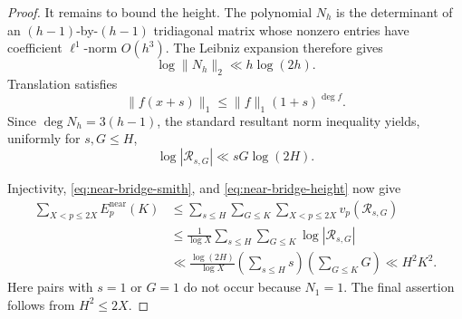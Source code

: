 \begin{proof}
It remains to bound the height.  The polynomial \(N_h\) is the determinant
of an \((h-1)\)-by-\((h-1)\) tridiagonal matrix whose nonzero entries have
coefficient \(\ell^1\)-norm \(O(h^3)\).  The Leibniz expansion therefore
gives
\[
 \log\lVert N_h\rVert_2\ll h\log(2h).
\]
Translation satisfies
\[
 \lVert f(x+s)\rVert_1
 \le \lVert f\rVert_1(1+s)^{\deg f}.
\]
Since \(\deg N_h=3(h-1)\), the standard resultant norm inequality yields,
uniformly for \(s,G\le H\),
\begin{equation}
 \log|\mathcal R_{s,G}|
 \ll sG\log(2H).
 \label{eq:near-bridge-height}
\end{equation}

Injectivity, \eqref{eq:near-bridge-smith}, and
\eqref{eq:near-bridge-height} now give
\[
 \begin{aligned}
 \sum_{X<p\le2X}E_p^{\mathrm{near}}(K)
 &\le
 \sum_{s\le H}\sum_{G\le K}\sum_{X<p\le2X}
 v_p(\mathcal R_{s,G})\\
 &\le
 \frac1{\log X}
 \sum_{s\le H}\sum_{G\le K}\log|\mathcal R_{s,G}|\\
 &\ll
 \frac{\log(2H)}{\log X}
 \left(\sum_{s\le H}s\right)
 \left(\sum_{G\le K}G\right)
 \ll H^2K^2.
 \end{aligned}
\]
Here pairs with \(s=1\) or \(G=1\) do not occur because \(N_1=1\).
The final assertion follows from \(H^2\le2X\).
\end{proof}
